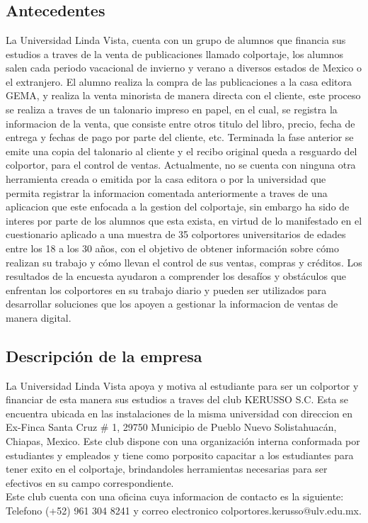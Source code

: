\documentclass[runningheads]{llncs}
\begin{document}
\section{}



\subsection{Antecedentes}
La Universidad Linda Vista, cuenta con un grupo de alumnos que financia sus estudios a traves de la venta de publicaciones llamado colportaje, los alumnos salen cada periodo vacacional de invierno y verano a diversos estados de Mexico o el extranjero. El alumno realiza la compra de las publicaciones a la casa editora GEMA, y realiza la venta minorista de manera directa con el cliente, este proceso se realiza a traves de un talonario impreso en papel, en el cual, se registra la informacion de la venta, que consiste entre otros titulo del libro, precio, fecha de entrega y fechas de pago por parte del cliente, etc. Terminada la fase anterior se emite una copia del talonario al cliente y el recibo original queda a resguardo del colportor, para el control de ventas.
Actualmente, no se cuenta con ninguna otra herramienta creada o emitida por la casa editora o por la universidad que permita registrar la informacion comentada anteriormente a traves de una aplicacion que este enfocada a la gestion del colportaje, sin embargo ha sido de interes por parte de los alumnos que esta exista, en virtud de lo manifestado en el cuestionario aplicado a una muestra de 35 colportores universitarios de edades entre los 18 a los 30 años, con el objetivo de obtener información sobre cómo realizan su trabajo y cómo llevan el control de sus ventas, compras y créditos. Los resultados de la encuesta ayudaron a comprender los desafíos y obstáculos que enfrentan los colportores en su trabajo diario y pueden ser utilizados para desarrollar soluciones que los apoyen a gestionar la informacion de ventas de manera digital.

\subsection{Descripción de la empresa}

La Universidad Linda Vista apoya y motiva al estudiante para ser un colportor y financiar de esta manera sus estudios a traves del club KERUSSO S.C. Esta se encuentra ubicada en las instalaciones de la misma universidad con direccion en Ex-Finca Santa Cruz \# 1, 29750 Municipio de Pueblo Nuevo Solistahuacán, Chiapas, Mexico. Este club dispone con una organización interna conformada por estudiantes y empleados y tiene como porposito capacitar a los estudiantes para tener exito en el colportaje, brindandoles herramientas necesarias para ser efectivos en su campo correspondiente.\\
Este club cuenta con una oficina cuya informacion de contacto es la siguiente: Telefono (+52) 961 304 8241 y correo electronico colportores.kerusso@ulv.edu.mx.
\end{document}
